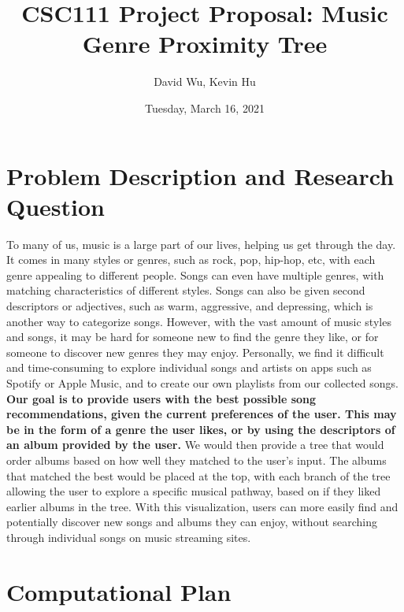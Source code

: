 \documentclass[fontsize=11pt]{article}
\title{CSC111 Project Proposal: Music Genre Proximity Tree}
\author{David Wu, Kevin Hu}
\date{Tuesday, March 16, 2021}
\begin{document}
\maketitle

\section*{Problem Description and Research Question}

To many of us, music is a large part of our lives, helping us get through the day. It comes in many styles or genres, such as rock, pop, hip-hop, etc, with each genre appealing to different people. Songs can even have multiple genres, with matching characteristics of different styles. Songs can also be given second descriptors or adjectives, such as warm, aggressive, and depressing, which is another way to categorize songs. However, with the vast amount of music styles and songs, it may be hard for someone new to find the genre they like, or for someone to discover new genres they may enjoy. Personally, we find it difficult and time-consuming to explore individual songs and artists on apps such as Spotify or Apple Music, and to create our own playlists from our collected songs. \textbf{Our goal is to provide users with the best possible song recommendations, given the current preferences of the user. This may be in the form of a genre the user likes, or by using the descriptors of an album provided by the user.} We would then provide a tree that would order albums based on how well they matched to the user's input. The albums that matched the best would be placed at the top, with each branch of the tree allowing the user to explore a specific musical pathway, based on if they liked earlier albums in the tree. With this visualization, users can more easily find and potentially discover new songs and albums they can enjoy, without searching through individual songs on music streaming sites.

\section*{Computational Plan}
\end{document}
